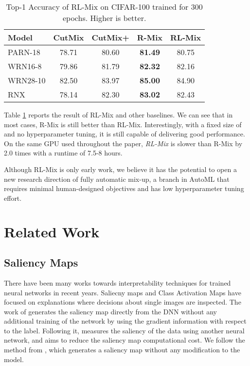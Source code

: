 \documentclass[letterpaper]{article} \usepackage[submission]{aaai23}  \usepackage{times}  \usepackage{helvet}  \usepackage{courier}  \usepackage[hyphens]{url}  \usepackage{graphicx} \urlstyle{rm} \def\UrlFont{\rm}  \usepackage{natbib}  \usepackage{caption} \frenchspacing  \setlength{\pdfpagewidth}{8.5in} \setlength{\pdfpageheight}{11in}
\newcommand{\rrlmix}{{R-Mix}}
\newcommand{\cifar}{CIFAR-100}
\begin{document}
\begin{table}[h!]
  \centering
  \begin{tabular}{lcc|cc}
    \hline
    Model  & CutMix & CutMix+ & R-Mix & RL-Mix \\ \hline
    PARN-18  & 78.71 & 80.60 & \textbf{81.49} & 80.75 \\
    WRN16-8  & 79.86 & 81.79 & \textbf{82.32} & 82.16 \\
    WRN28-10  & 82.50 & 83.97 & \textbf{85.00} & 84.90 \\
    RNX & 78.14 & 82.30 & \textbf{83.02} & 82.43 \\ \hline
    \end{tabular}
  \caption{Top-1 Accuracy of RL-Mix on \cifar{} trained for 300 epochs. Higher is better.}
  \label{tab:results2}
\end{table}

Table \ref{tab:results2} reports the result of RL-Mix and other baselines. We can see that in most cases, \rrlmix{} is still better than RL-Mix. Interestingly, with a fixed size of  and no hyperparameter tuning, it is still capable of delivering good performance. On the same GPU used throughout the paper, \textit{RL-Mix} is slower than \rrlmix{} by 2.0 times with a runtime of 7.5-8 hours.

Although RL-Mix is only early work, we believe it has the potential to open a new research direction of fully automatic mix-up, a branch in AutoML that requires minimal human-designed objectives and has low hyperparameter tuning effort.


 
\section{Related Work}
\label{sec:related}
\subsection{Saliency Maps}
There have been many works towards interpretability techniques for trained neural networks in recent years. Saliecny maps \cite{simonyan2014sal} and Class Activation Maps \cite{zhou2015learning} have focused on explanations where decisions about single images are inspected.
The work of \cite{simonyan2014sal} generates the saliency map directly from the DNN without any additional training of the network by using the gradient information with respect to the label. Following it, \cite{zhao2015sal} measures the saliency of the data using another neural network, and \cite{Zhou2016sal} aims to reduce the saliency map computational cost. We follow the method from \cite{simonyan2014sal}, which generates a saliency map without any modification to the model.
\end{document}
